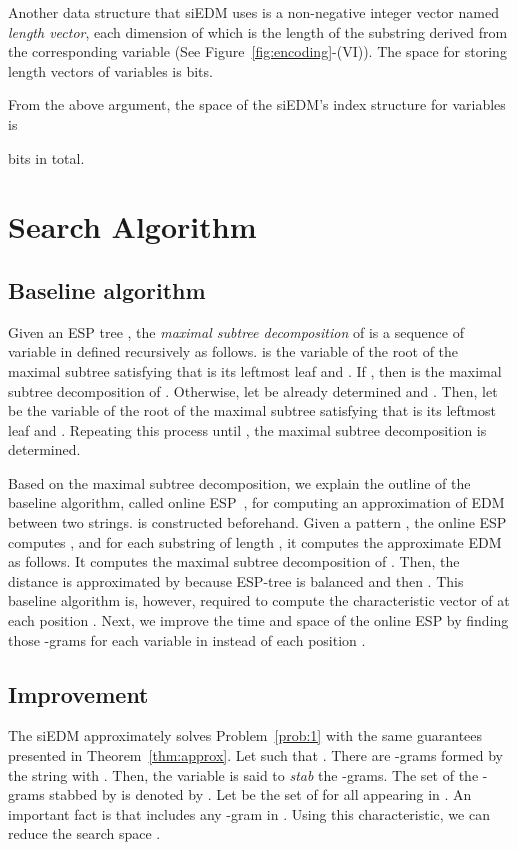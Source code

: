 \documentclass[12pt,a4paper]{scrartcl}
\begin{document}
Another data structure that siEDM uses is a non-negative integer
vector named \emph{length vector}, each dimension of which is the
length of the substring derived from the corresponding variable (See
Figure~\ref{fig:encoding}-(VI)).  The space for storing length vectors
of  variables is  bits.

From the above argument, the space of the siEDM's index structure for
 variables is

bits in total.

\section{Search Algorithm}\label{sec:sa}

\subsection{Baseline algorithm}

Given an ESP tree , the \emph{maximal subtree decomposition} of  
is a sequence  of variable in  defined recursively as follows.
 is the variable of the root of the maximal subtree satisfying that
 is its leftmost leaf and .
If , then  is the maximal subtree decomposition of .
Otherwise, let  be already determined and 
.
Then, let  be the variable of the root of the maximal subtree satisfying that
 is its leftmost leaf and .
Repeating this process until ,
the maximal subtree decomposition is determined.

Based on the maximal subtree decomposition, 
we explain the outline of the baseline algorithm, called online
ESP~\cite{Takabatake14-2}, for computing an approximation of EDM
between two strings.   is constructed beforehand.  
Given a pattern , the online ESP computes , and for each substring
 of length , it computes the approximate EDM as follows.
It computes the maximal subtree decomposition  of . 
Then, the distance  is approximated by
 because ESP-tree is balanced and
then .  This baseline
algorithm is, however, required to compute the characteristic vector
of  at each position .  Next, we improve the time and space
of the online ESP by finding those -grams for each variable 
in  instead of each position .

\subsection{Improvement}

The siEDM approximately solves Problem~\ref{prob:1} with the same
guarantees presented in Theorem~\ref{thm:approx}.  Let
 such that .  There are
-grams formed by the string
 with
.  Then, the variable  is said to
\emph{stab} the -grams.  The set of the -grams stabbed by
 is denoted by .  Let  be the
set of  for all  appearing in .  An
important fact is that  includes any -gram in
.  Using this characteristic, we can reduce the search space .
\end{document}

